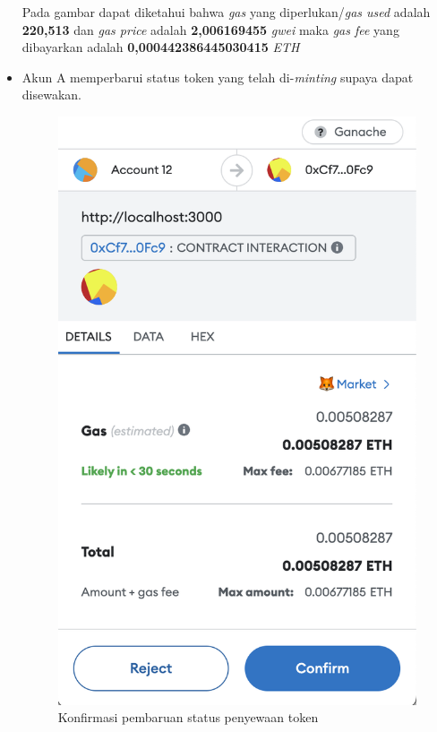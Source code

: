 \begin{itemize}
      Pada gambar dapat diketahui bahwa \emph{gas} yang diperlukan/\emph{gas used} adalah \textbf{220,513} dan \emph{gas price} adalah \textbf{2,006169455} \emph{gwei} maka \emph{gas fee} yang dibayarkan adalah \textbf{0,000442386445030415} \emph{ETH}
      \item Akun A memperbarui status token yang telah di-\emph{minting} supaya dapat disewakan.
      \begin{figure} [H] \centering
          \includegraphics[scale=0.3]{gambar/img-test-rent-put-item-for-rent-1.png}
          \caption{Konfirmasi pembaruan status penyewaan token}
          \label{fig:TestRentKonfirmasiPembaruanPenyewa}

\end{figure}
\end{itemize}
